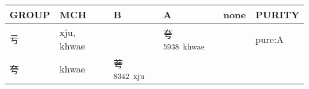 \documentclass[14pt,a4paper]{scrartcl}
\begin{document}
\begin{longtable}[c]{@{}llllll@{}}
\toprule
\begin{minipage}[b]{0.14\columnwidth}\raggedright\strut
GROUP
\strut\end{minipage} &
\begin{minipage}[b]{0.14\columnwidth}\raggedright\strut
MCH
\strut\end{minipage} &
\begin{minipage}[b]{0.14\columnwidth}\raggedright\strut
B
\strut\end{minipage} &
\begin{minipage}[b]{0.14\columnwidth}\raggedright\strut
A
\strut\end{minipage} &
\begin{minipage}[b]{0.14\columnwidth}\raggedright\strut
none
\strut\end{minipage} &
\begin{minipage}[b]{0.14\columnwidth}\raggedright\strut
PURITY
\strut\end{minipage}\tabularnewline
\midrule
\endhead
\begin{minipage}[t]{0.14\columnwidth}\raggedright\strut
亏
\strut\end{minipage} &
\begin{minipage}[t]{0.14\columnwidth}\raggedright\strut
xju, khwae
\strut\end{minipage} &
\begin{minipage}[t]{0.14\columnwidth}\raggedright\strut
\strut\end{minipage} &
\begin{minipage}[t]{0.14\columnwidth}\raggedright\strut
夸\textsuperscript{5938~khwae}
\strut\end{minipage} &
\begin{minipage}[t]{0.14\columnwidth}\raggedright\strut
\strut\end{minipage} &
\begin{minipage}[t]{0.14\columnwidth}\raggedright\strut
pure:A
\strut\end{minipage}\tabularnewline
\begin{minipage}[t]{0.14\columnwidth}\raggedright\strut
夸
\strut\end{minipage} &
\begin{minipage}[t]{0.14\columnwidth}\raggedright\strut
khwae
\strut\end{minipage} &
\begin{minipage}[t]{0.14\columnwidth}\raggedright\strut
荂\textsuperscript{8342~xju}
\strut\end{minipage} &

\end{longtable}
\end{document}
